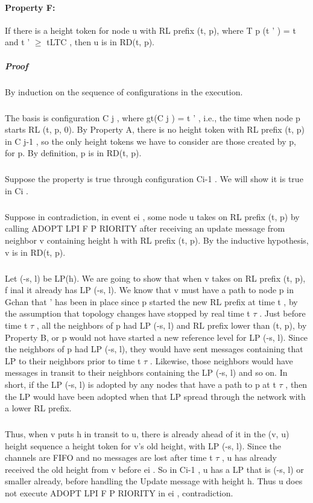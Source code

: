 \paragraph{Property F:} If there is a height token for node u with RL prefix (t, p), where T p (t ' ) = t and t ' $\geq$ tLTC , then u is in RD(t, p).
\subparagraph{Proof} By induction on the sequence of configurations in the execution.
\subparagraph{}The basis is configuration C j , where gt(C j ) = t ' , i.e., the time when node p starts RL (t, p, 0). By Property A, there is no height token with RL prefix (t, p) in C j-1 , so the only height tokens we have to consider are those created by p, for p. By definition, p is in RD(t, p).
\subparagraph{}Suppose the property is true through configuration Ci-1 . We will show it is true in Ci .
\subparagraph{}Suppose in contradiction, in event ei , some node u takes on RL prefix (t, p) by calling ADOPT LPI F P RIORITY after receiving an update message from neighbor v containing height h with RL prefix (t, p). By the inductive hypothesis, v is in RD(t, p).
\subparagraph{}Let (-s, l) be LP(h). We are going to show that when v takes on RL prefix (t, p), f inal it already has LP (-s, l). We know that v must have a path to node p in Gchan that ' has been in place since p started the new RL prefix at time t , by the assumption that topology changes have stopped by real time t $\tau$ . Just before time t $\tau$ , all the neighbors of p had LP (-s, l) and RL prefix lower than (t, p), by Property B, or p would not have started a new reference level for LP (-s, l). Since the neighbors of p had LP (-s, l), they would have sent messages containing that LP to their neighbors prior to time t $\tau$ . Likewise, those neighbors would have messages in transit to their neighbors containing the LP (-s, l) and so on. In short, if the LP (-s, l) is adopted by any nodes that have a path to p at t $\tau$ , then the LP would have been adopted when that LP spread through the network with a lower RL prefix. 
\subparagraph{}Thus, when v puts h in transit to u, there is already ahead of it in the (v, u) height sequence a height token for v's old height, with LP (-s, l). Since the channels are FIFO and no messages are lost after time t $\tau$ , u has already received the old height from v before ei . So in Ci-1 , u has a LP that is (-s, l) or smaller already, before handling the Update message with height h. Thus u does not execute ADOPT LPI F P RIORITY in ei , contradiction.
